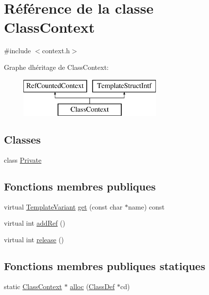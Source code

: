 \hypertarget{class_class_context}{}\section{Référence de la classe Class\+Context}
\label{class_class_context}


{\ttfamily \#include $<$context.\+h$>$}

Graphe d\textquotesingle{}héritage de Class\+Context\+:\begin{figure}[H]
\begin{center}
\leavevmode
\includegraphics[height=2.000000cm]{class_class_context}
\end{center}
\end{figure}
\subsection*{Classes}
\begin{DoxyCompactItemize}
\item 
class \hyperlink{class_class_context_1_1_private}{Private}
\end{DoxyCompactItemize}
\subsection*{Fonctions membres publiques}
\begin{DoxyCompactItemize}
\item 
virtual \hyperlink{class_template_variant}{Template\+Variant} \hyperlink{class_class_context_a82ff8f3d2cee194b8768b28c6379b17f}{get} (const char $\ast$name) const 
\item 
virtual int \hyperlink{class_class_context_acb15feacf639082eca1d686f54dec3db}{add\+Ref} ()
\item 
virtual int \hyperlink{class_class_context_a0be571acb1fbb5bf559fda7daad05a36}{release} ()
\end{DoxyCompactItemize}
\subsection*{Fonctions membres publiques statiques}
\begin{DoxyCompactItemize}
\item 
static \hyperlink{class_class_context}{Class\+Context} $\ast$ \hyperlink{class_class_context_a88d70584244511b67166f983fdb58b2e}{alloc} (\hyperlink{class_class_def}{Class\+Def} $\ast$cd)
\end{DoxyCompactItemize}


